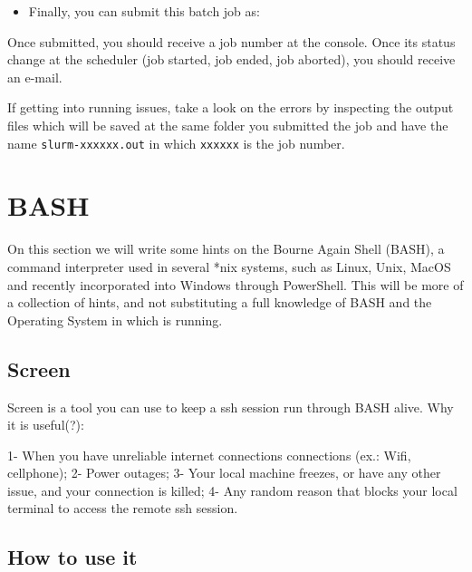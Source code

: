 \documentclass[
]{book}
\newenvironment{Shaded}{\begin{snugshade}}{\end{snugshade}}
\newcommand{\ExtensionTok}[1]{#1}
\newcommand{\NormalTok}[1]{#1}
\providecommand{\tightlist}{%
  \setlength{\itemsep}{0pt}\setlength{\parskip}{0pt}}
\begin{document}
\begin{itemize}
\tightlist
\item
  Finally, you can submit this batch job as:
\end{itemize}

\begin{Shaded}
\end{Shaded}

Once submitted, you should receive a job number at the console. Once its status
change at the scheduler (job started, job ended, job aborted), you should receive
an e-mail.

If getting into running issues, take a look on the errors by inspecting the
output files which will be saved at the same folder you submitted the job and
have the name \texttt{slurm-xxxxxx.out} in which \texttt{xxxxxx} is the job number.

\hypertarget{bash}{%
\chapter{BASH}\label{bash}}

On this section we will write some hints on the Bourne Again Shell (BASH), a command interpreter used in several *nix systems, such as Linux, Unix, MacOS and recently incorporated into Windows through PowerShell. This will be more of a collection of hints, and not substituting a full knowledge of BASH and the Operating System in which is running.

\hypertarget{screen}{%
\section{Screen}\label{screen}}

Screen is a tool you can use to keep a ssh session run through BASH alive. Why it is useful(?):

1- When you have unreliable internet connections connections (ex.: Wifi, cellphone);
2- Power outages;
3- Your local machine freezes, or have any other issue, and your connection is killed;
4- Any random reason that blocks your local terminal to access the remote ssh session.

\hypertarget{how-to-use-it}{%
\section{How to use it}\label{how-to-use-it}}
\end{document}
